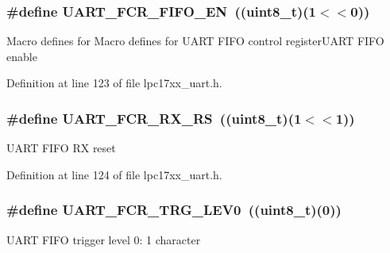 \subsubsection[{\texorpdfstring{U\+A\+R\+T\+\_\+\+F\+C\+R\+\_\+\+F\+I\+F\+O\+\_\+\+EN}{UART_FCR_FIFO_EN}}]{\setlength{\rightskip}{0pt plus 5cm}\#define U\+A\+R\+T\+\_\+\+F\+C\+R\+\_\+\+F\+I\+F\+O\+\_\+\+EN~(({\bf uint8\+\_\+t})(1$<$$<$0))}\hypertarget{group___u_a_r_t___private___macros_gadec12ecfc7ae1198cee68f2cad982bcb}{}\label{group___u_a_r_t___private___macros_gadec12ecfc7ae1198cee68f2cad982bcb}
Macro defines for Macro defines for U\+A\+RT F\+I\+FO control register\+U\+A\+RT F\+I\+FO enable 

Definition at line 123 of file lpc17xx\+\_\+uart.\+h.

\subsubsection[{\texorpdfstring{U\+A\+R\+T\+\_\+\+F\+C\+R\+\_\+\+R\+X\+\_\+\+RS}{UART_FCR_RX_RS}}]{\setlength{\rightskip}{0pt plus 5cm}\#define U\+A\+R\+T\+\_\+\+F\+C\+R\+\_\+\+R\+X\+\_\+\+RS~(({\bf uint8\+\_\+t})(1$<$$<$1))}\hypertarget{group___u_a_r_t___private___macros_ga246b37ccd6137c0bb51eb32760cb228e}{}\label{group___u_a_r_t___private___macros_ga246b37ccd6137c0bb51eb32760cb228e}
U\+A\+RT F\+I\+FO RX reset 

Definition at line 124 of file lpc17xx\+\_\+uart.\+h.

\subsubsection[{\texorpdfstring{U\+A\+R\+T\+\_\+\+F\+C\+R\+\_\+\+T\+R\+G\+\_\+\+L\+E\+V0}{UART_FCR_TRG_LEV0}}]{\setlength{\rightskip}{0pt plus 5cm}\#define U\+A\+R\+T\+\_\+\+F\+C\+R\+\_\+\+T\+R\+G\+\_\+\+L\+E\+V0~(({\bf uint8\+\_\+t})(0))}\hypertarget{group___u_a_r_t___private___macros_gaba4b4e15936a075bf5054776fbd59676}{}\label{group___u_a_r_t___private___macros_gaba4b4e15936a075bf5054776fbd59676}
U\+A\+RT F\+I\+FO trigger level 0\+: 1 character 

